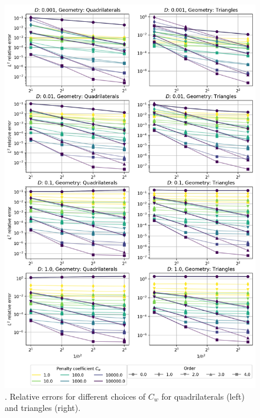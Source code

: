 \begin{figure}[p!]
	\centering
	\includegraphics[height=\textheight]{../figs/parametric/advdiff_2D/quarteroni1.png}
	\caption{. Relative errors for different choices of $C_w$ for 
	quadrilaterals (left) and triangles (right).}
	\label{fig:qconv1}
\end{figure}

